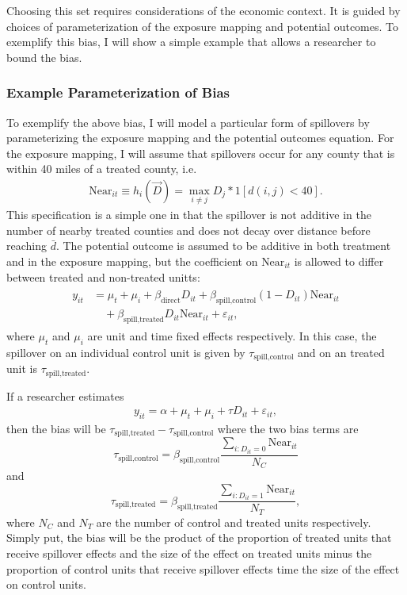 \documentclass[11pt]{article}
\begin{document}
Choosing this set requires considerations of the economic context. It is guided by choices of parameterization of the exposure mapping and potential outcomes. To exemplify this bias, I will show a simple example that allows a researcher to bound the bias. 


\subsubsection{Example Parameterization of Bias}

To exemplify the above bias, I will model a particular form of spillovers by parameterizing the exposure mapping and the potential outcomes equation. For the exposure mapping, I will assume that spillovers occur for any county that is within 40 miles of a treated county, i.e. 
\begin{align}
    \label{eq:example_exposure}
    \text{Near}_{it} \equiv h_i(\vec{D}) = \max_{i \neq j} D_j * 1[ d(i,j) < 40 ].
\end{align}
This specification is a simple one in that the spillover is not additive in the number of nearby treated counties and does not decay over distance before reaching $\bar{d}$. The potential outcome is assumed to be additive in both treatment and in the exposure mapping, but the coefficient on $\text{Near}_{it}$ is allowed to differ between treated and non-treated unitts:
\begin{align}
    \label{eq:example_po}
    \begin{split}
        y_{it} &= \mu_t + \mu_i + \beta_{\text{direct}} D_{it} + \beta_{\text{spill,control}} (1-D_{it}) \text{Near}_{it} \\
        &\quad + \beta_{\text{spill,treated}} D_{it} \text{Near}_{it} + \varepsilon_{it},
    \end{split}
\end{align}
where $\mu_t$ and $\mu_i$ are unit and time fixed effects respectively. In this case, the spillover on an individual control unit is given by $\tau_{\text{spill,control}}$ and on an treated unit is $\tau_{\text{spill,treated}}$. 

If a researcher estimates 
\begin{align}
    \label{eq:twfe}    
    y_{it} = \alpha + \mu_t + \mu_i + \tau D_{it} + \varepsilon_{it},    
\end{align}
then the bias will be $\tau_{\text{spill,treated}} - \tau_{\text{spill,control}}$ where the two bias terms are \[ 
    \tau_{\text{spill,control}} = \beta_{\text{spill,control}} \frac{\sum_{i: D_{it} = 0} \text{Near}_{it}}{N_C}
\] and \[ 
    \tau_{\text{spill,treated}} = \beta_{\text{spill,treated}} \frac{\sum_{i: D_{it} = 1} \text{Near}_{it}}{N_T},
\]
where $N_C$ and $N_T$ are the number of control and treated units respectively. Simply put, the bias will be the product of the proportion of treated units that receive spillover effects and the size of the effect on treated units minus the proportion of control units that receive spillover effects time the size of the effect on control units. 
\end{document}
